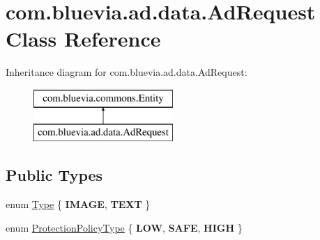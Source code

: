 \hypertarget{classcom_1_1bluevia_1_1ad_1_1data_1_1AdRequest}{
\section{com.bluevia.ad.data.AdRequest Class Reference}
\label{classcom_1_1bluevia_1_1ad_1_1data_1_1AdRequest}
}
Inheritance diagram for com.bluevia.ad.data.AdRequest:\begin{figure}[H]
\begin{center}
\leavevmode
\includegraphics[height=2.000000cm]{classcom_1_1bluevia_1_1ad_1_1data_1_1AdRequest}
\end{center}
\end{figure}
\subsection*{Public Types}
\begin{DoxyCompactItemize}
\item 
enum \hyperlink{classcom_1_1bluevia_1_1ad_1_1data_1_1AdRequest_a09c6520d8fe767e50b3629a4a3583ef3}{Type} \{ {\bfseries IMAGE}, 
{\bfseries TEXT}
 \}
\item 
enum \hyperlink{classcom_1_1bluevia_1_1ad_1_1data_1_1AdRequest_abd707475c19957f294689451d338c099}{ProtectionPolicyType} \{ {\bfseries LOW}, 
{\bfseries SAFE}, 
{\bfseries HIGH}
 \}
\end{DoxyCompactItemize}
